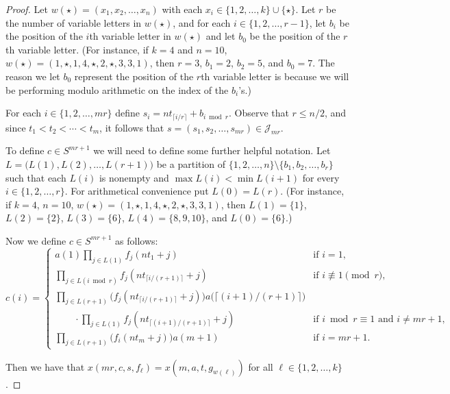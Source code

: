 \documentclass[12pt,showtrims]{memoir}
\theoremstyle{plain}
\theoremstyle{definition}
\newcommand{\calJ}{\mathcal{J}}
\begin{document}
\begin{proof}
  Let $w(\star) = (x_1, x_2, \ldots, x_n)$ with each $x_i \in \{1, 2, \ldots, k\} \cup \{\star\}$. 
  Let $r$ be the number of variable letters in $w(\star)$, and for each $i \in \{1, 2, \ldots, r-1\}$, let $b_i$ be the position of the \mbox{$i$th} variable letter in $w(\star)$ and let $b_0$ be the position of the \mbox{$r$th} variable letter.
  (For instance, if $k = 4$ and $n = 10$, $w(\star) = (1, \star, 1, 4, \star, 2, \star, 3, 3, 1)$, then $r = 3$, $b_1 = 2$, $b_2 = 5$, and $b_0 = 7$.
  The reason we let $b_0$ represent the position of the \mbox{$r$th} variable letter is because we will be performing modulo arithmetic on the index of the $b_i$'s.)

  For each $i \in \{1, 2, \ldots, mr\}$ define $s_i = nt_{\lceil i/r \rceil} + b_{i \bmod r}$.
  Observe that $r \le n/2$, and since $t_1 < t_2 < \cdots < t_m$, it follows that $s = (s_1, s_2, \ldots, s_{mr}) \in \calJ_{mr}$.

  To define $c \in S^{mr+1}$ we will need to define some further helpful notation. 
  Let $L = \bigl( L(1), L(2), \ldots, L(r+1) \bigr)$ be a partition of $\{1, 2, \ldots, n\} \setminus \{b_1, b_2, \ldots, b_r\}$ such that each $L(i)$ is nonempty and $\max L(i) < \min L(i+1)$ for every $i \in \{1, 2, \ldots, r\}$. 
  For arithmetical convenience put $L(0) = L(r)$. 
  (For instance, if $k = 4$, $n = 10$, $w(\star) = (1, \star, 1, 4, \star, 2, \star, 3, 3, 1)$, then $L(1) = \{1\}$, $L(2) = \{2\}$, $L(3) = \{6\}$, $L(4) = \{8, 9, 10\}$, and $L(0) = \{6\}$.)

  Now we define $c \in S^{mr+1}$ as follows:
  \[
    c(i) = 
    \begin{cases}
      a(1)\prod_{j \in L(1)} f_j(nt_1 + j) & \mbox{if $i = 1$,} \\
      \prod_{j \in L(i \bmod r)}  f_j(nt_{\lceil i/(r+1) \rceil} + j) & \mbox{if $i \not\equiv 1 \pmod r$, }\\
      \prod_{j \in L(r+1)} \bigl( f_j(nt_{\lceil i/(r+1) \rceil} + j) \bigr) a\bigl( \lceil (i+1)/(r+1) \rceil \bigr) & \\
      \hspace{2em} \cdot\prod_{j \in L(1)} f_j(nt_{\lceil (i+1)/(r+1) \rceil} + j) & \mbox{if $i \bmod r \equiv 1$ and $i \ne mr +1$, }\\
      \prod_{j \in L(r+1)} \bigr( f_i(nt_m + j) \bigr) a(m+1) & \mbox{if $i = mr + 1$.}
    \end{cases}
  \]

  Then we have that $x(mr, c, s, f_\ell) = x(m, a, t, g_{w(\ell)})$ for all $\ell \in \{1, 2, \ldots, k\}$.
\end{proof}
\end{document}
